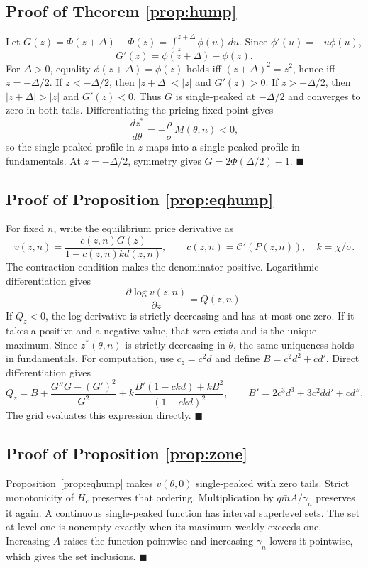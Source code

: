 \documentclass[11pt]{article}
\theoremstyle{definition}
\begin{document}
\subsection{Proof of Theorem \ref{prop:hump}}
Let $G(z)=\Phi(z+\Delta)-\Phi(z)=\int_z^{z+\Delta}\phi(u)\,du$. Since $\phi'(u)=-u\phi(u)$,
\[
G'(z)=\phi(z+\Delta)-\phi(z).
\]
For $\Delta>0$, equality $\phi(z+\Delta)=\phi(z)$ holds iff $(z+\Delta)^2=z^2$, hence iff $z=-\Delta/2$. If $z<-\Delta/2$, then $|z+\Delta|<|z|$ and $G'(z)>0$. If $z>-\Delta/2$, then $|z+\Delta|>|z|$ and $G'(z)<0$. Thus $G$ is single-peaked at $-\Delta/2$ and converges to zero in both tails. Differentiating the pricing fixed point gives
\[
\frac{dz^*}{d\theta}=-\frac{\rho}{\sigma}\,M(\theta,n)<0,
\]
so the single-peaked profile in $z$ maps into a single-peaked profile in fundamentals. At $z=-\Delta/2$, symmetry gives $G=2\Phi(\Delta/2)-1$. $\blacksquare$

\subsection{Proof of Proposition \ref{prop:eqhump}}
For fixed $n$, write the equilibrium price derivative as
\[
v(z,n)=\frac{c(z,n)G(z)}{1-c(z,n)k d(z,n)},
\qquad c(z,n)=\mathcal C'(P(z,n)),\quad k=\chi/\sigma.
\]
The contraction condition makes the denominator positive. Logarithmic differentiation gives
\[
\frac{\partial\log v(z,n)}{\partial z}=Q(z,n).
\]
If $Q_z<0$, the log derivative is strictly decreasing and has at most one zero. If it takes a positive and a negative value, that zero exists and is the unique maximum. Since $z^*(\theta,n)$ is strictly decreasing in $\theta$, the same uniqueness holds in fundamentals. For computation, use $c_z=c^2d$ and define $B=c^2d^2+cd'$. Direct differentiation gives
\[
Q_z=B+\frac{G''G-(G')^2}{G^2}
+k\frac{B'(1-ckd)+kB^2}{(1-ckd)^2},
\qquad
B'=2c^3d^3+3c^2dd'+cd''.
\]
The grid evaluates this expression directly. $\blacksquare$

\subsection{Proof of Proposition \ref{prop:zone}}
Proposition~\ref{prop:eqhump} makes $v(\theta,0)$ single-peaked with zero tails. Strict monotonicity of $H_c$ preserves that ordering. Multiplication by $q\bar mA/\gamma_n$ preserves it again. A continuous single-peaked function has interval superlevel sets. The set at level one is nonempty exactly when its maximum weakly exceeds one. Increasing $A$ raises the function pointwise and increasing $\gamma_n$ lowers it pointwise, which gives the set inclusions. $\blacksquare$
\end{document}
